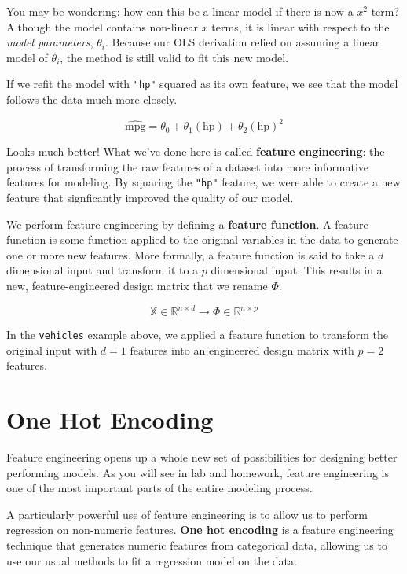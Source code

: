 \documentclass[
  letterpaper,
  DIV=11,
  numbers=noendperiod]{scrreprt}
\begin{document}
You may be wondering: how can this be a linear model if there is now a
\(x^2\) term? Although the model contains non-linear \(x\) terms, it is
linear with respect to the \emph{model parameters}, \(\theta_i\).
Because our OLS derivation relied on assuming a linear model of
\(\theta_i\), the method is still valid to fit this new model.

If we refit the model with \texttt{"hp"} squared as its own feature, we
see that the model follows the data much more closely.

\[\hat{\text{mpg}} = \theta_0 + \theta_1 (\text{hp}) + \theta_2 (\text{hp})^2\]

Looks much better! What we've done here is called \textbf{feature
engineering}: the process of transforming the raw features of a dataset
into more informative features for modeling. By squaring the
\texttt{"hp"} feature, we were able to create a new feature that
signficantly improved the quality of our model.

We perform feature engineering by defining a \textbf{feature function}.
A feature function is some function applied to the original variables in
the data to generate one or more new features. More formally, a feature
function is said to take a \(d\) dimensional input and transform it to a
\(p\) dimensional input. This results in a new, feature-engineered
design matrix that we rename \(\Phi\).

\[\mathbb{X} \in \mathbb{R}^{n \times d} \longrightarrow \Phi \in \mathbb{R}^{n \times p}\]

In the \texttt{vehicles} example above, we applied a feature function to
transform the original input with \(d=1\) features into an engineered
design matrix with \(p=2\) features.

\hypertarget{one-hot-encoding}{%
\section{One Hot Encoding}\label{one-hot-encoding}}

Feature engineering opens up a whole new set of possibilities for
designing better performing models. As you will see in lab and homework,
feature engineering is one of the most important parts of the entire
modeling process.

A particularly powerful use of feature engineering is to allow us to
perform regression on non-numeric features. \textbf{One hot encoding} is
a feature engineering technique that generates numeric features from
categorical data, allowing us to use our usual methods to fit a
regression model on the data.
\end{document}
